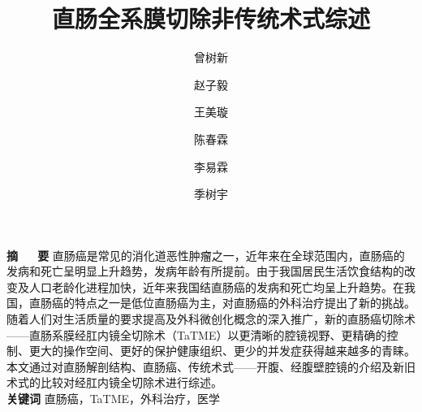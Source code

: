 \documentclass[a4paper,11pt,onecolumn,twoside]{article}
\begin{document}
\title{\huge{直肠全系膜切除非传统术式综述}}

\author[]{曾树新}{}
\author[]{赵子毅}{}
\author[]{王美璇}{}
\author[]{陈春霖}{}
\author[]{李易霖}{}
\author[]{季树宇}{}



\renewcommand\Authands{ 和~ }


\date{}



\pagestyle{fancy}
\fancyhf{}
\headheight 26.70523pt
\fancyhead[RE,RO]{\thepage}
\lfoot{}
\cfoot{}
\rfoot{}

\newenvironment{figurehere}
{\def\@captype{figure}}
{}
\makeatother

\maketitle

\newcommand{\supercite}[1]{\textsuperscript{\cite{#1}}}


\setlength{\oddsidemargin}{1cm}  %
\setlength{\evensidemargin}{\oddsidemargin}
\setlength{\textwidth}{13.50cm}
\vspace{-.8cm}
\begin{center}
    \parbox{\textwidth}{
        \textbf{摘~~~要} \quad  直肠癌是常见的消化道恶性肿瘤之一，近年来在全球范围内，直肠癌的发病和死亡呈明显上升趋势，发病年龄有所提前。由于我国居民生活饮食结构的改变及人口老龄化进程加快，近年来我国结直肠癌的发病和死亡均呈上升趋势。在我国，直肠癌的特点之一是低位直肠癌为主，对直肠癌的外科治疗提出了新的挑战。随着人们对生活质量的要求提高及外科微创化概念的深入推广，新的直肠癌切除术——直肠系膜经肛内镜全切除术（TaTME）以更清晰的腔镜视野、更精确的控制、更大的操作空间、更好的保护健康组织、更少的并发症获得越来越多的青睐。本文通过对直肠解剖结构、直肠癌、传统术式——开腹、经腹壁腔镜的介绍及新旧术式的比较对经肛内镜全切除术进行综述。
        \\
        \textbf{关键词} \quad 直肠癌，TaTME，外科治疗，医学}
\end{center}
\end{document}
